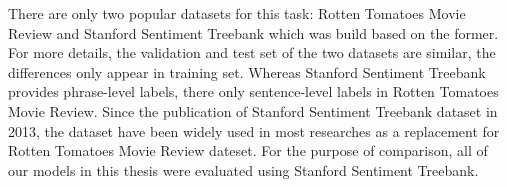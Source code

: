 There are only two popular datasets for this task: Rotten Tomatoes Movie Review\cite{Rotten-Tomato} and Stanford Sentiment Treebank\cite{socher2013recursive} which was build based on the former.
For more details, the validation and test set of the two datasets are similar, the differences only appear in training set.
Whereas Stanford Sentiment Treebank provides phrase-level labels, there only sentence-level labels in Rotten Tomatoes Movie Review\cite{socher2013recursive}.
Since the publication of Stanford Sentiment Treebank dataset in 2013, the dataset have been widely used in most researches as a replacement for Rotten Tomatoes Movie Review dateset\cite{treeLSTM}\cite{KimCNN}\cite{cnn-rnn}\cite{2-layer-cnn}\cite{socher2013recursive}.
For the purpose of comparison, all of our models in this thesis were evaluated using Stanford Sentiment Treebank.

